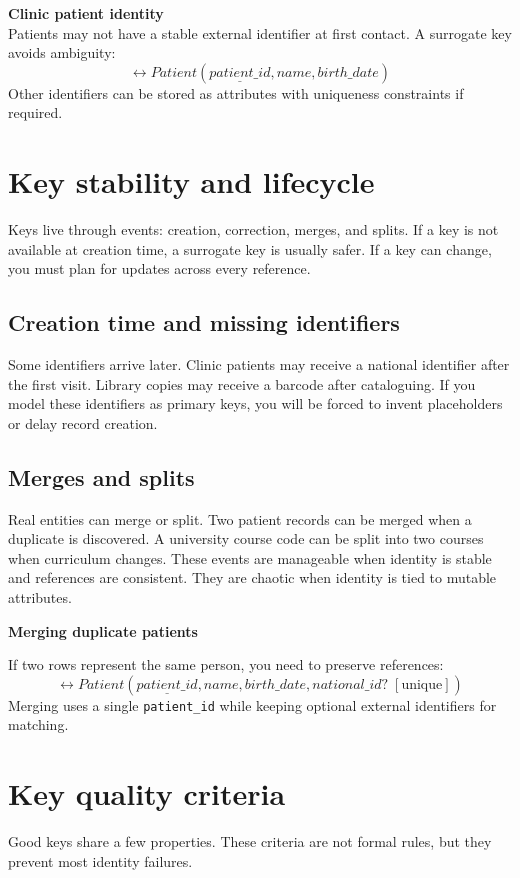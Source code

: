\begin{examplebox}
\textbf{Clinic patient identity}\\
Patients may not have a stable external identifier at first contact.
A surrogate key avoids ambiguity:
\[
\rel{Patient}(\underline{patient\_id}, name, birth\_date)
\]
Other identifiers can be stored as attributes with uniqueness constraints if required.
\end{examplebox}

\section{Key stability and lifecycle}
Keys live through events: creation, correction, merges, and splits.
If a key is not available at creation time, a surrogate key is usually safer.
If a key can change, you must plan for updates across every reference.

\subsection{Creation time and missing identifiers}
Some identifiers arrive later.
Clinic patients may receive a national identifier after the first visit.
Library copies may receive a barcode after cataloguing.
If you model these identifiers as primary keys, you will be forced to invent placeholders or delay record creation.

\subsection{Merges and splits}
Real entities can merge or split.
Two patient records can be merged when a duplicate is discovered.
A university course code can be split into two courses when curriculum changes.
These events are manageable when identity is stable and references are consistent.
They are chaotic when identity is tied to mutable attributes.

\begin{examplebox}
\textbf{Merging duplicate patients}\par\smallskip
If two rows represent the same person, you need to preserve references:
\[
\rel{Patient}(\underline{patient\_id}, name, birth\_date, national\_id? \;[\text{unique}])
\]
Merging uses a single \texttt{patient\_id} while keeping optional external identifiers for matching.
\end{examplebox}

\section{Key quality criteria}
Good keys share a few properties.
These criteria are not formal rules, but they prevent most identity failures.

